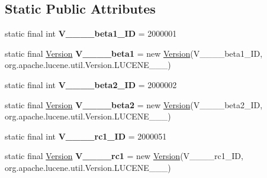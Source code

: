 \subsection*{Static Public Attributes}
\begin{DoxyCompactItemize}
\item 
\hypertarget{classorg_1_1elasticsearch_1_1_version_ae67971c05a341e8421ee39d8e77d508d}{}\label{classorg_1_1elasticsearch_1_1_version_ae67971c05a341e8421ee39d8e77d508d} 
static final int {\bfseries V\+\_\+\_\+\_\+\_\+beta1\+\_\+\+ID} = 2000001
\item 
\hypertarget{classorg_1_1elasticsearch_1_1_version_a4b79c3ca4e491ec29822ca019e695a02}{}\label{classorg_1_1elasticsearch_1_1_version_a4b79c3ca4e491ec29822ca019e695a02} 
static final \hyperlink{classorg_1_1elasticsearch_1_1_version}{Version} {\bfseries V\+\_\+\_\+\_\+\_\+beta1} = new \hyperlink{classorg_1_1elasticsearch_1_1_version}{Version}(V\+\_\+\_\+\_\+\_\+beta1\+\_\+\+ID, org.\+apache.\+lucene.\+util.\+Version.\+L\+U\+C\+E\+N\+E\+\_\+\_\+\_)
\item 
\hypertarget{classorg_1_1elasticsearch_1_1_version_a510d159b11776327ae3867239aec1146}{}\label{classorg_1_1elasticsearch_1_1_version_a510d159b11776327ae3867239aec1146} 
static final int {\bfseries V\+\_\+\_\+\_\+\_\+beta2\+\_\+\+ID} = 2000002
\item 
\hypertarget{classorg_1_1elasticsearch_1_1_version_a21a68fea86cce98773377c6e65156507}{}\label{classorg_1_1elasticsearch_1_1_version_a21a68fea86cce98773377c6e65156507} 
static final \hyperlink{classorg_1_1elasticsearch_1_1_version}{Version} {\bfseries V\+\_\+\_\+\_\+\_\+beta2} = new \hyperlink{classorg_1_1elasticsearch_1_1_version}{Version}(V\+\_\+\_\+\_\+\_\+beta2\+\_\+\+ID, org.\+apache.\+lucene.\+util.\+Version.\+L\+U\+C\+E\+N\+E\+\_\+\_\+\_)
\item 
\hypertarget{classorg_1_1elasticsearch_1_1_version_a697af71ea3287723d904b1f69726debf}{}\label{classorg_1_1elasticsearch_1_1_version_a697af71ea3287723d904b1f69726debf} 
static final int {\bfseries V\+\_\+\_\+\_\+\_\+rc1\+\_\+\+ID} = 2000051
\item 
\hypertarget{classorg_1_1elasticsearch_1_1_version_a897706a30581a547efec56f4b4c4d03a}{}\label{classorg_1_1elasticsearch_1_1_version_a897706a30581a547efec56f4b4c4d03a} 
static final \hyperlink{classorg_1_1elasticsearch_1_1_version}{Version} {\bfseries V\+\_\+\_\+\_\+\_\+rc1} = new \hyperlink{classorg_1_1elasticsearch_1_1_version}{Version}(V\+\_\+\_\+\_\+\_\+rc1\+\_\+\+ID, org.\+apache.\+lucene.\+util.\+Version.\+L\+U\+C\+E\+N\+E\+\_\+\_\+\_)

\end{DoxyCompactItemize}

